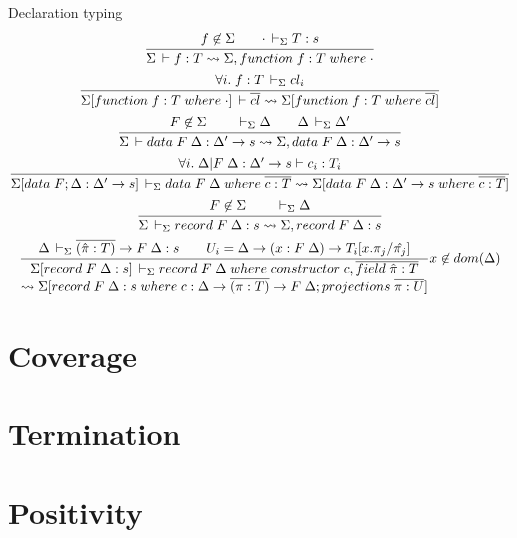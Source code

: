 \documentclass[acmlarge,fleqn]{acmart}\settopmatter{}
\renewcommand{\|}{\mid}
\begin{document}
Declaration typing 
\begin{gather*}
\ru{f \not\in \Sigma \qquad \cdot \ders T : s}
   {\Sigma \der f : T \leadsto \Sigma, function\; f : T\; where\; \cdot}
\\
\ru{\forall i.\; f : T \ders cl_i}
   {\Sigma[function\; f : T\; where\; \cdot] \der \overline{cl} \leadsto \Sigma[function\; f : T\; where\; \overline{cl}]}
\\
\ru{F \not\in \Sigma \qquad \ders \Delta \qquad \Delta \ders \Delta'}
   {\Sigma \der data\; F\; \Delta : \Delta' \to s \leadsto \Sigma, data\; F\; \Delta : \Delta' \to s}
\\
\ru{\forall i.\; \Delta | F\; \Delta : \Delta' \to s \vdash c_i : T_i}
   {\Sigma[data\; F; \Delta : \Delta' \to s] \ders data\; F\; \Delta\; where\; \overline{c : T} \leadsto \Sigma[data\; F\; \Delta : \Delta' \to s\; where\; \overline{c : T}]}
\\
\ru{F \not\in \Sigma \qquad \ders \Delta}
   {\Sigma \ders record\; F \; \Delta : s \leadsto \Sigma, record\; F\; \Delta : s}
\\
\ru{\Delta \ders \overline{(\hat{\pi} : T)} \to F\; \Delta : s \qquad
    U_i = \Delta \to (x : F\; \Delta) \to T_i[x.\pi_j / \hat{\pi_j}] }
   {\Sigma[record\; F\; \Delta : s] \ders record\; F\; \Delta\; where\; constructor\; c, \overline{field\; \hat{\pi} : T} \\  \leadsto \Sigma[record\; F\; \Delta : s\; where\; c : \Delta \to \overline{(\pi : T)} \to F\; \Delta; projections\; \overline{\pi : U}]} x \not\in dom(\Delta)
\end{gather*}







\section{Coverage}
\label{sec:coverage}

\section{Termination}
\label{sec:termination}

\section{Positivity}
\label{sec:positivity}
\end{document}
